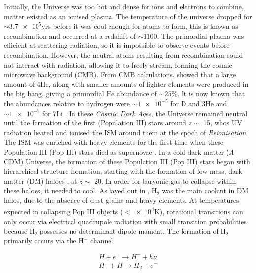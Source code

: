 \documentclass[11pt]{article}
\begin{document}
Initially, the Universe was too hot and dense for ions and electrons to combine, matter existed as an ionised plasma. The temperature of the universe dropped for $\sim\num{3.7e5}$yrs before it was cool enough for atoms to form, this is known as recombination and occurred at a redshift of $\sim1100$. The primordial plasma was efficient at scattering radiation, so it is impossible to observe events before recombination. However, the neutral atoms resulting from recombination could not interact with radiation, allowing it to freely stream, forming the cosmic microwave background (CMB). From CMB calculations, \citet{Peebles1966} showed that a large amount of 4He, along with smaller amounts of lighter elements were produced in the big bang, giving a primordial He abundance of $\sim25\%$. It is now known that the abundances relative to hydrogen were $\sim\num{1e-5}$ for D and 3He and $\sim\num{1e-7}$ for 7Li \citep{Copi1995}. In these \emph{Cosmic Dark Ages}, the Universe remained neutral until the formation of the first (Population III) stars around $z \sim$ 15, whos UV radiation heated and ionised the ISM around them \citep{Bromm2001} at the epoch of \emph{Reionisation}. The ISM was enriched  with heavy elements for the first time when these Population III (Pop III) stars died as supernovae \citep{Heger2003}.
In a cold dark matter ($\Lambda$CDM) Universe, the formation of these Population III (Pop III) stars began with hierarchical structure formation, starting with the formation of low mass, dark matter (DM) haloes \citep{Couchman1986}, at $z \sim$ 20.
In order for baryonic gas to collapse within these haloes, it needed to cool. As layed out in \cite{Bromm2002}, H$_{2}$ was the main coolant in DM halos, due to the absence of dust grains and heavy elements. At temperatures expected in collapsing Pop III objects ($<$\num{e4}K), rotational transitions can only occur via electrical quadrupole radiation with small transition probabilities because H$_{2}$ possesses no determinant dipole moment. The formation of H$_{2}$ primarily occurs via the H$^{-}$ channel

\begin{equation}
\begin{split}
H + e^{-} \rightarrow H^{-} + h\nu
\\
H^{-} + H \rightarrow H_{2} + e^{-}
\end{split}
\end{equation}
\end{document}

